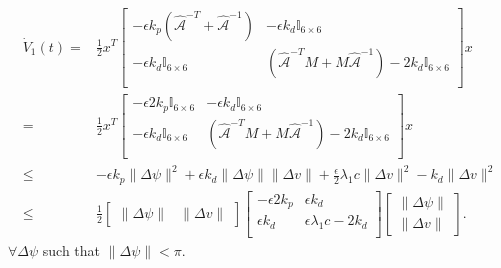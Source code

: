 \begin{align}
\dot{V}_1(t) =&\frac{1}{2} x^T \left[\begin{array}{cc}
  -\epsilon k_p \left(\hat{\mathcal{A}}^{-T}+\hat{\mathcal{A}}^{-1}\right) &
 -\epsilon k_d \mathbb{I}_{6 \times 6}        \\
  -\epsilon k_d \mathbb{I}_{6 \times 6}              &  
\left(\hat{\mathcal{A}}^{-T} M +M \hat{\mathcal{A}}^{-1}
\right)- 2k_d\mathbb{I}_{6 \times 6}                \\
\end{array} \right] x
\nonumber \\
 =&\frac{1}{2} x^T \left[\begin{array}{cc}
  -\epsilon2k_p\mathbb{I}_{6 \times 6}  &
 -\epsilon k_d \mathbb{I}_{6 \times 6}        \\
  -\epsilon k_d \mathbb{I}_{6 \times 6}              &  
\left(\hat{\mathcal{A}}^{-T} M +M \hat{\mathcal{A}}^{-1}
\right)- 2k_d\mathbb{I}_{6 \times 6}                \\
\end{array} \right] x
\nonumber \\
\leq& -\epsilon  k_p \|\Delta\psi\|^2+\epsilon k_d\|\Delta
\psi\|\|\Delta v\| +\frac{\epsilon}{2}\lambda_1 c \|\Delta v\|^2
-  k_d \|\Delta v\|^2
\nonumber \\
 \leq&\frac{1}{2}\left[\begin{array}{cc}
   \|\Delta \psi\| & \|\Delta v\|
   \end{array} \right] 
  \left[\begin{array}{cc}
  -\epsilon 2 k_p  & \epsilon k_d    \\
 \epsilon k_d      &   \epsilon \lambda_1 c- 2k_d\\
  \end{array} \right] 
\left[\begin{array}{c}
   \|\Delta \psi\| \\ \|\Delta v\|
   \end{array} \right]. 
\label{chUV_AMBC.eq.lyap_dot_bound}
\end{align}
%
$\forall \Delta \psi$ such that $\|\Delta\psi\|<\pi$.
